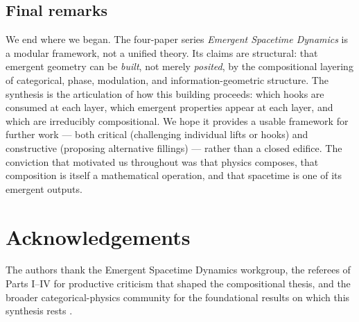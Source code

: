\documentclass[12pt]{article}
\theoremstyle{definition}
\theoremstyle{remark}
\begin{document}
\subsection{Final remarks}

We end where we began. The four-paper series \emph{Emergent Spacetime
Dynamics} is a modular framework, not a unified theory. Its claims are
structural: that emergent geometry can be \emph{built}, not merely
\emph{posited}, by the compositional layering of categorical, phase,
modulation, and information-geometric structure. The synthesis is the
articulation of how this building proceeds: which hooks are consumed at
each layer, which emergent properties appear at each layer, and which are
irreducibly compositional. We hope it provides a usable framework for
further work --- both critical (challenging individual lifts or hooks) and
constructive (proposing alternative fillings) --- rather than a closed
edifice. The conviction that motivated us throughout was that physics
composes, that composition is itself a mathematical operation, and that
spacetime is one of its emergent outputs.

\section*{Acknowledgements}

The authors thank the Emergent Spacetime Dynamics workgroup, the
referees of Parts I--IV for productive criticism that shaped the
compositional thesis, and the broader categorical-physics community for
the foundational results on which this synthesis rests
\cite{atiyah1988, baezdolan1995, baezstay2009, abramskycoecke2004,
lurie2009, kitaev2003, levinwen2005, chen2013, kitaevpreskill2006,
else2016, khemani2016, bukov2015, rudner2020, roy2017, pyhp2015,
ryutakayanagi2006, vanraamsdonk2010, maldacena1997, maldacenasusskind2013,
amari2016, fghmv2014}.
\end{document}
